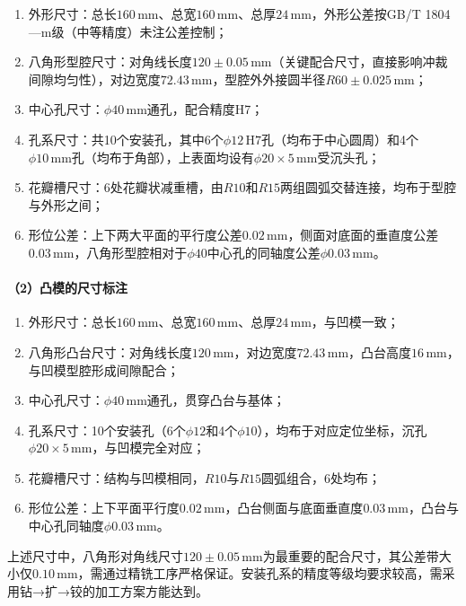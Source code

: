\documentclass{xautCADreport}
\begin{document}
\begin{enumerate}
  \item 外形尺寸：总长$160\,\mathrm{mm}$、总宽$160\,\mathrm{mm}$、总厚$24\,\mathrm{mm}$，外形公差按GB/T 1804—m级（中等精度）未注公差控制；
  \item 八角形型腔尺寸：对角线长度$120\pm0.05\,\mathrm{mm}$（关键配合尺寸，直接影响冲裁间隙均匀性），对边宽度$72.43\,\mathrm{mm}$，型腔外外接圆半径$R60\pm0.025\,\mathrm{mm}$；
  \item 中心孔尺寸：$\phi40\,\mathrm{mm}$通孔，配合精度H7；
  \item 孔系尺寸：共10个安装孔，其中6个$\phi12\,\mathrm{H7}$孔（均布于中心圆周）和4个$\phi10\,\mathrm{mm}$孔（均布于角部），上表面均设有$\phi20\times5\,\mathrm{mm}$受沉头孔；
  \item 花瓣槽尺寸：6处花瓣状减重槽，由$R10$和$R15$两组圆弧交替连接，均布于型腔与外形之间；
  \item 形位公差：上下两大平面的平行度公差$0.02\,\mathrm{mm}$，侧面对底面的垂直度公差$0.03\,\mathrm{mm}$，八角形型腔相对于$\phi40$中心孔的同轴度公差$\phi0.03\,\mathrm{mm}$。
\end{enumerate}

\paragraph{（2）凸模的尺寸标注}

\begin{enumerate}
  \item 外形尺寸：总长$160\,\mathrm{mm}$、总宽$160\,\mathrm{mm}$、总厚$24\,\mathrm{mm}$，与凹模一致；
  \item 八角形凸台尺寸：对角线长度$120\,\mathrm{mm}$，对边宽度$72.43\,\mathrm{mm}$，凸台高度$16\,\mathrm{mm}$，与凹模型腔形成间隙配合；
  \item 中心孔尺寸：$\phi40\,\mathrm{mm}$通孔，贯穿凸台与基体；
  \item 孔系尺寸：10个安装孔（6个$\phi12$和4个$\phi10$），均布于对应定位坐标，沉孔$\phi20\times5\,\mathrm{mm}$，与凹模完全对应；
  \item 花瓣槽尺寸：结构与凹模相同，$R10$与$R15$圆弧组合，6处均布；
  \item 形位公差：上下平面平行度$0.02\,\mathrm{mm}$，凸台侧面与底面垂直度$0.03\,\mathrm{mm}$，凸台与中心孔同轴度$\phi0.03\,\mathrm{mm}$。
\end{enumerate}

上述尺寸中，八角形对角线尺寸$120\pm0.05\,\mathrm{mm}$为最重要的配合尺寸，其公差带大小仅$0.10\,\mathrm{mm}$，需通过精铣工序严格保证。安装孔系的精度等级均要求较高，需采用钻→扩→铰的加工方案方能达到。
\end{document}
